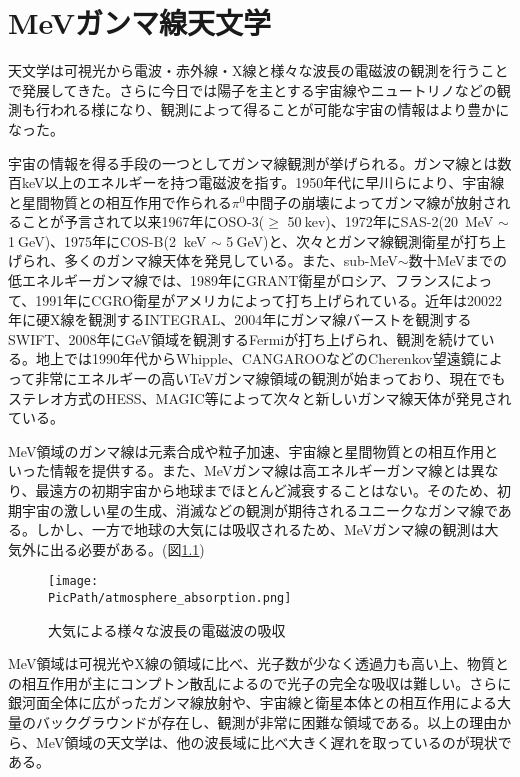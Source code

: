 \def\PicPath{/Users/ken/Documents/shuron/chapter1}
\chapter{MeVガンマ線天文学}
天文学は可視光から電波・赤外線・X線と様々な波長の電磁波の観測を行うことで発展してきた。さらに今日では陽子を主とする宇宙線やニュートリノなどの観測も行われる様になり、観測によって得ることが可能な宇宙の情報はより豊かになった。

宇宙の情報を得る手段の一つとしてガンマ線観測が挙げられる。ガンマ線とは数百keV以上のエネルギーを持つ電磁波を指す。1950年代に早川らにより、宇宙線と星間物質との相互作用で作られる$\pi^{0}$中間子の崩壊によってガンマ線が放射されることが予言されて以来1967年にOSO-3($\geq$ 50$\ $kev)、1972年にSAS-2(20\ MeV $\sim$ 1$\ $GeV)、1975年にCOS-B(2 $\ $keV $\sim$ 5$\ $GeV)と、次々とガンマ線観測衛星が打ち上げられ、多くのガンマ線天体を発見している。また、sub-MeV$\sim$数十MeVまでの低エネルギーガンマ線では、1989年にGRANT衛星がロシア、フランスによって、1991年にCGRO衛星がアメリカによって打ち上げられている。近年は20022年に硬X線を観測するINTEGRAL、2004年にガンマ線バーストを観測するSWIFT、2008年にGeV領域を観測するFermiが打ち上げられ、観測を続けている。地上では1990年代からWhipple、CANGAROOなどのCherenkov望遠鏡によって非常にエネルギーの高いTeVガンマ線領域の観測が始まっており、現在でもステレオ方式のHESS、MAGIC等によって次々と新しいガンマ線天体が発見されている。

MeV領域のガンマ線は元素合成や粒子加速、宇宙線と星間物質との相互作用といった情報を提供する。また、MeVガンマ線は高エネルギーガンマ線とは異なり、最遠方の初期宇宙から地球までほとんど減衰することはない。そのため、初期宇宙の激しい星の生成、消滅などの観測が期待されるユニークなガンマ線である。しかし、一方で地球の大気には吸収されるため、MeVガンマ線の観測は大気外に出る必要がある。(図\ref{fig:atm_absp})
\begin{figure}
\centering
\texttt{[image: \\PicPath/atmosphere\_absorption.png]}
\caption{大気による様々な波長の電磁波の吸収\cite{oda_and_matsuoka}}
\label{fig:atm_absp}
\end{figure}

MeV領域は可視光やX線の領域に比べ、光子数が少なく透過力も高い上、物質との相互作用が主にコンプトン散乱によるので光子の完全な吸収は難しい。さらに銀河面全体に広がったガンマ線放射や、宇宙線と衛星本体との相互作用による大量のバックグラウンドが存在し、観測が非常に困難な領域である。以上の理由から、MeV領域の天文学は、他の波長域に比べ大きく遅れを取っているのが現状である。

